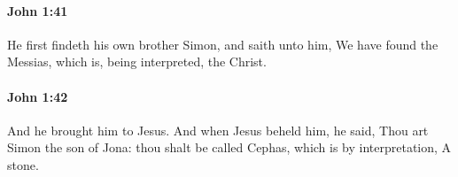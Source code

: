 		\paragraph{John 1:41} %
			\label{JOHN-1-41}

			He first findeth his own brother Simon, and saith unto him, We have found the Messias, which is, being interpreted, the Christ.

			\begin{framed}
			\scriptsize
				\begin{compactdesc}
					\item[SBLG]  \hyperref[CHRISTOS]{}
				\end{compactdesc}
			\end{framed}

		\paragraph{John 1:42} %
			\label{JOHN-1-42}

			And he brought him to Jesus. And when Jesus beheld him, he said, Thou art Simon the son of Jona: thou shalt be called Cephas, which is by interpretation, A stone.

